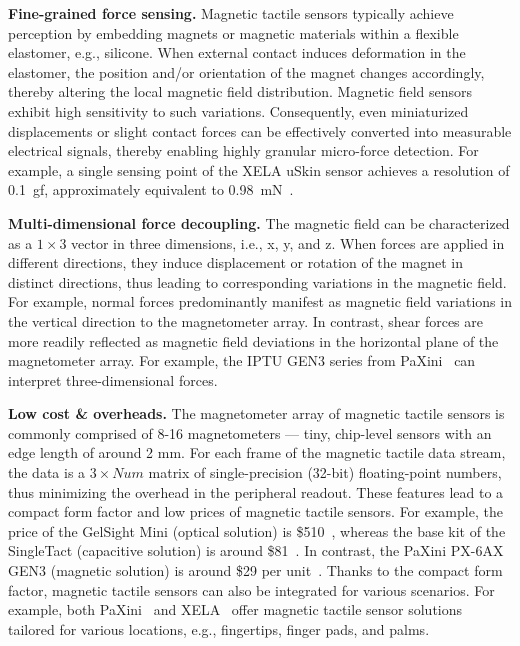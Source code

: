 \noindent\textbf{Fine-grained force sensing.} 
Magnetic tactile sensors typically achieve perception by embedding magnets or magnetic materials within a flexible elastomer, e.g., silicone. 
When external contact induces deformation in the elastomer, the position and/or orientation of the magnet changes accordingly, thereby altering the local magnetic field distribution. Magnetic field sensors exhibit high sensitivity to such variations.
Consequently, even miniaturized displacements or slight contact forces can be effectively converted into measurable electrical signals, thereby enabling highly granular micro-force detection. 
For example, a single sensing point of the XELA uSkin sensor achieves a resolution of 0.1~gf, approximately equivalent to 0.98~mN~\cite{xela2026technology}.

\noindent\textbf{Multi-dimensional force decoupling.} 
The magnetic field can be characterized as a $1\times3$ vector in three dimensions, i.e., x, y, and z.
When forces are applied in different directions, they induce displacement or rotation of the magnet in distinct directions, thus leading to corresponding variations in the magnetic field. 
For example, normal forces predominantly manifest as magnetic field variations in the vertical direction to the magnetometer array. 
In contrast, shear forces are more readily reflected as magnetic field deviations in the horizontal plane of the magnetometer array. 
For example, the IPTU GEN3 series from PaXini~\cite{paxini2026px6axgen3} can interpret three-dimensional forces.

\noindent\textbf{Low cost \& overheads.}
The magnetometer array of magnetic tactile sensors is commonly comprised of 8-16 magnetometers --- tiny, chip-level sensors with an edge length of around 2 mm.
For each frame of the magnetic tactile data stream, the data is a $3\times Num$ matrix of single-precision (32-bit) floating-point numbers, thus minimizing the overhead in the peripheral readout.
These features lead to a compact form factor and low prices of magnetic tactile sensors.
For example, the price of the GelSight Mini (optical solution) is \$510~\cite{gelsightMiniProduct}, whereas the base kit of the SingleTact (capacitive solution) is around \$81~\cite{singletact2026calibration}.
In contrast, the PaXini PX-6AX GEN3 (magnetic solution) is around \$29 per unit~\cite{paxini2026px6axgen3mall}.
Thanks to the compact form factor, magnetic tactile sensors can also be integrated for various scenarios. 
For example, both PaXini~\cite{paxini2026official} and XELA~\cite{xela2026official} offer magnetic tactile sensor solutions tailored for various locations, e.g., fingertips, finger pads, and palms.

